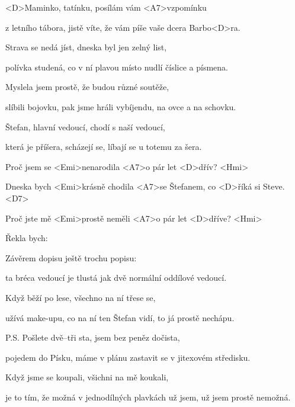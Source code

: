 

\zs
<D>Maminko, tatínku, posílám vám <A7>vzpomínku

z letního tábora, jistě víte, že vám píše vaše dcera Barbo<D>ra.
\ks

\zs 
Strava se nedá jíst, dneska byl jen zelný list,

polívka studená, co v ní plavou místo nudlí číslice a písmena.
\ks
 
\zs
Myslela jsem prostě, že budou různé soutěže,

slíbili bojovku, pak jsme hráli vybíjendu, na ovce a na schovku.
\ks
 
\zs
Štefan, hlavní vedoucí, chodí s naší vedoucí,

která je příšera, scházejí se, líbají se u totemu za šera.
\ks
 
\zr
Proč jsem se <Emi>nenarodila <A7>o pár let <D>dřív? <Hmi>

Dneska bych <Emi>krásně chodila <A7>se Štefanem, co <D>říká si Steve. <D7>

Proč jste mě <Emi>prostě neměli <A7>o pár let <D>dříve? <Hmi>

Řekla bych: 
\kr
 
\zs
Závěrem dopisu ještě trochu popisu:

ta bréca vedoucí je tlustá jak dvě normální oddílové vedoucí.
\ks
 
\zs
Když běží po lese, všechno na ní třese se,

užívá make-upu, co na ní ten Štefan vidí, to já prostě nechápu.
\ks
 
\zr\kr
 
\zs
P.S. Pošlete dvě--tři sta, jsem bez peněz dočista,

pojedem do Písku, máme v plánu zastavit se v jitexovém středisku.
\ks

\zs 
Když jsme se koupali, všichni na mě koukali,

je to tím, že možná v jednodílných plavkách už jsem, 
už jsem prostě nemožná.
\ks

\zr\kr

\kp
